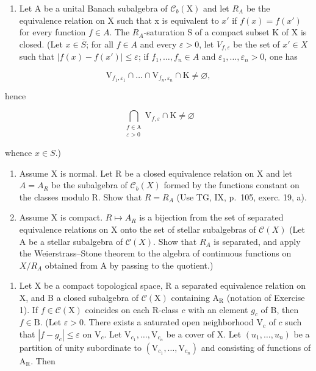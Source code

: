 \begin{enumerate}
\def\labelenumi{\alph{enumi})}
\tightlist
\item
  Let A be a unital Banach subalgebra of \(\mathcal{C}_{b}(\mathrm{X})\) and let \(R_{A}\) be the equivalence relation on X such that x is equivalent to \(x'\) if \(f(x) = f(x')\) for every function \(f \in A\). The \(R_{A}\)-saturation S of a compact subset K of X is closed. (Let \(x \in \overline{S}\); for all \(f \in A\) and every \(\varepsilon > 0\), let \(V_{f,\varepsilon}\) be the set of \(x' \in X\) such that \(|f(x) - f(x')| \leqslant \varepsilon\); if \(f_{1}, \ldots, f_{n} \in A\) and \(\varepsilon_{1}, \ldots, \varepsilon_{n} > 0\), one has
\end{enumerate}

\[
\mathrm{V} _ {f _ {1}, \varepsilon_ {1}} \cap \dots \cap \mathrm{V} _ {f _ {n}, \varepsilon_ {n}} \cap \mathrm{K} \neq \varnothing ,
\]

hence

\[
\bigcap_{\substack{f\in \mathrm{A}\\ \varepsilon >0}}\mathrm{V}_{f,\varepsilon}\cap \mathrm{K}\neq \varnothing
\]

whence \(x \in S\).)

\begin{enumerate}
\def\labelenumi{\alph{enumi})}
\setcounter{enumi}{1}
\item
  Assume X is normal. Let R be a closed equivalence relation on X and let \(A = A_{R}\) be the subalgebra of \(\mathcal{C}_{b}(X)\) formed by the functions constant on the classes modulo R. Show that \(R = R_{A}\) (Use TG, IX, p.~105, exerc. 19, a).
\item
  Assume X is compact. \(R \mapsto A_{R}\) is a bijection from the set of separated equivalence relations on X onto the set of stellar subalgebras of \(\mathcal{C}(X)\) (Let A be a stellar subalgebra of \(\mathcal{C}(X)\). Show that \(R_{A}\) is separated, and apply the Weierstrass–Stone theorem to the algebra of continuous functions on \(X/R_{A}\) obtained from A by passing to the quotient.)
\end{enumerate}

\begin{enumerate}
\def\labelenumi{\arabic{enumi})}
\setcounter{enumi}{1}
\tightlist
\item
  Let X be a compact topological space, R a separated equivalence relation on X, and B a closed subalgebra of \(\mathcal{C}(\mathrm{X})\) containing \(\mathrm{A}_{\mathrm{R}}\) (notation of Exercise 1). If \(f \in \mathcal{C}(\mathrm{X})\) coincides on each R-class \(c\) with an element \(g_{c}\) of B, then \(f \in \mathrm{B}\). (Let \(\varepsilon > 0\). There exists a saturated open neighborhood \(\mathrm{V}_{c}\) of \(c\) such that \(|f - g_{c}| \leqslant \varepsilon\) on \(\mathrm{V}_{c}\). Let \(\mathrm{V}_{c_{1}}, \ldots, \mathrm{V}_{c_{n}}\) be a cover of X. Let \((u_{1}, \ldots, u_{n})\) be a partition of unity subordinate to \((\mathrm{V}_{c_{1}}, \ldots, \mathrm{V}_{c_{n}})\) and consisting of functions of \(\mathrm{A}_{\mathrm{R}}\). Then
\end{enumerate}

